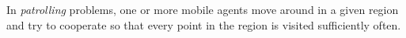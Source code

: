 
In \emph{patrolling} problems, one or more mobile agents move around in a given region and try to cooperate so that every point in the region is visited sufficiently often. 
